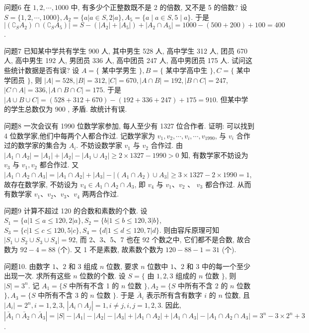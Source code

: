 问题6 在 $1,2, \cdots, 1000$ 中, 有多少个正整数既不是 2 的倍数, 又不是 5 的倍数?
设 $S=\{1,2, \cdots, 1000\}, A_2=\{a|a \in S, 2| a\}, A_5=\{a \mid a \in S, 5 \mid a\}$. 于是 $\left|\left(\complement_S A_2\right) \cap\left(\complement_S A_5\right)\right|=S-\left(\left|A_2\right|+\left|A_5\right|\right)+\left|A_2 \cap A_5\right|= 1000-(500+200)+100=400$.



问题7 已知某中学共有学生 900 人, 其中男生 528 人, 高中学生 312 人, 团员 670 人, 高中男生 192 人, 男团员 336 人, 高中团员 247 人, 高中男团员 175 人.
试问这些统计数据是否有误?
设 $A=\{$ 某中学男生 $\}, B=\{$ 某中学高中生 $\}, C=\{$ 某中学团员 $\}$, 则 $|A|=528,|B|=312,|C|=670,|A \cap B|=192,|B \cap C|=247$, $|C \cap A|=336,|A \cap B \cap C|=175$. 于是 $|A \cup B \cup C|=(528+312+ 670)-(192+336+247)+175=910$. 但某中学的学生总数仅为 900 , 矛盾.
故统计有误.



问题8 一次会议有 1990 位数学家参加, 每人至少有 1327 位合作者.
证明: 可以找到 4 位数学家,他们中每两个人都合作过.
记数学家为 $v_1, v_2, \cdots, v_i, \cdots, v_{1990}$, 与 $v_i$ 合作过的数学家的集合为 $A_i$. 不妨设数学家 $v_1$ 与 $v_2$ 合作过.
由 $\left|A_1 \cap A_2\right|=\left|A_1\right|+\left|A_2\right|-\mid A_1 \cup A_2 \mid \geqslant 2 \times 1327-1990>0$ 知, 有数学家不妨设为 $v_3$ 与 $v_1, v_2$ 都合作过.
又 $\left|A_1 \cap A_2 \cap A_3\right|=\left|A_1 \cap A_2\right|+\left|A_3\right|-\left|\left(A_1 \cap A_2\right) \cup A_3\right| \geqslant 3 \times 1327- 2 \times 1990=1$, 故存在数学家, 不妨设为 $v_4 \in A_1 \cap A_2 \cap A_3$, 即 $v_4$ 与 $v_1 、 v_2$ 、 $v_3$ 都合作过.
从而有数学家 $v_1 、 v_2 、 v_3 、 v_4$ 两两合作过.



问题9 计算不超过 120 的合数和素数的个数.
设 $S_1=\{a|1 \leqslant a \leqslant 120,2| a\}, S_2=\{b|1 \leqslant b \leqslant 120,3| b\}$, $S_3=\{c|1 \leqslant c \leqslant 120,5| c\}, S_4=\{d|1 \leqslant d \leqslant 120,7| d\}$. 则由容斥原理可知 $\left|S_1 \cup S_2 \cup S_3 \cup S_4\right|=92$, 而 2、3、5、7 也在 92 个数之中, 它们都不是合数, 故合数为 $92-4=88$ (个). 又 1 不是素数, 故素数个数为 $120-88- 1=31$ (个).



问题10. 由数字 $1 、 2$ 和 3 组成 $n$ 位数, 要求 $n$ 位数中 $1 、 2$ 和 3 中的每一个至少出现一次.
求所有这些 $n$ 位数的个数.
设 $S=\{$ 由 $1,2,3$ 组成的 $n$ 位数 $\}$, 则 $|S|=3^n$. 记 $A_1=\{S$ 中所有不含 1 的 $n$ 位数 $\}, A_2=\{S$ 中所有不含 2 的 $n$ 位数 $\}, A_3=\{S$ 中所有不含 3 的 $n$ 位数 $\}$. 于是 $\bar{A}_i$ 表示所有含有数字 $i$ 的 $n$ 位数, 且 $\left|A_i\right|=2^n, i=1,2,3$, $\left|A_i \cap A_j\right|=1, i \neq j, i, j=1,2,3$. 因此, $\left|\bar{A}_1 \cap \bar{A}_2 \cap \bar{A}_3\right|=|S|- \left|A_1\right|-\left|A_2\right|-\left|A_3\right|+\left|A_1 \cap A_2\right|+\left|A_1 \cap A_3\right|-\left|A_1 \cap A_2 \cap A_3\right|=3^n- 3 \times 2^n+3$.



